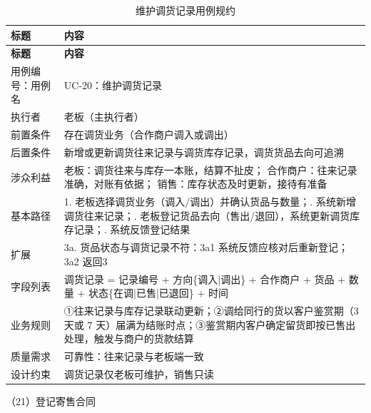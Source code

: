 \documentclass[12pt, a4paper]{ctexart}
\begin{document}
{\small
\begin{longtable}{@{}p{2.4cm} p{12.9cm}@{}}
\caption{维护调货记录用例规约}\label{tab:uc-20}\\
\toprule
\textbf{标题} & \textbf{内容} \\
\midrule
\endfirsthead
\toprule
\textbf{标题} & \textbf{内容} \\
\midrule
\endhead
用例编号：用例名 & UC-20：维护调货记录 \\
\midrule
执行者 & 老板（主执行者） \\
\midrule
前置条件 & 存在调货业务（合作商户调入或调出） \\
\midrule
后置条件 & 新增或更新调货往来记录与调货库存记录，调货货品去向可追溯 \\
\midrule
涉众利益 & 老板：调货往来与库存一本账，结算不扯皮；\newline
合作商户：往来记录准确，对账有依据；\newline
销售：库存状态及时更新，接待有准备 \\
\midrule
基本路径 & 1. 老板选择调货业务（调入/调出）并确认货品与数量；\newline
2. 系统新增调货往来记录；\newline
3. 老板登记货品去向（售出/退回），系统更新调货库存记录；\newline
4. 系统反馈登记结果 \\
\midrule
扩展 & 3a. 货品状态与调货记录不符：3a1 系统反馈应核对后重新登记；3a2 返回3 \\
\midrule
字段列表 & 调货记录 = 记录编号 + 方向\{调入|调出\} + 合作商户 + 货品 + 数量 + 状态\{在调|已售|已退回\} + 时间 \\
\midrule
业务规则 & ①往来记录与库存记录联动更新；\newline ②调给同行的货以客户鉴赏期（3 天或 7 天）届满为结账时点；\newline ③鉴赏期内客户确定留货即按已售出处理，触发与商户的货款结算 \\
\midrule
质量需求 & 可靠性：往来记录与老板端一致 \\
\midrule
设计约束 & 调货记录仅老板可维护，销售只读 \\
\midrule
\bottomrule
\end{longtable}}

\noindent（21）登记寄售合同
\end{document}
